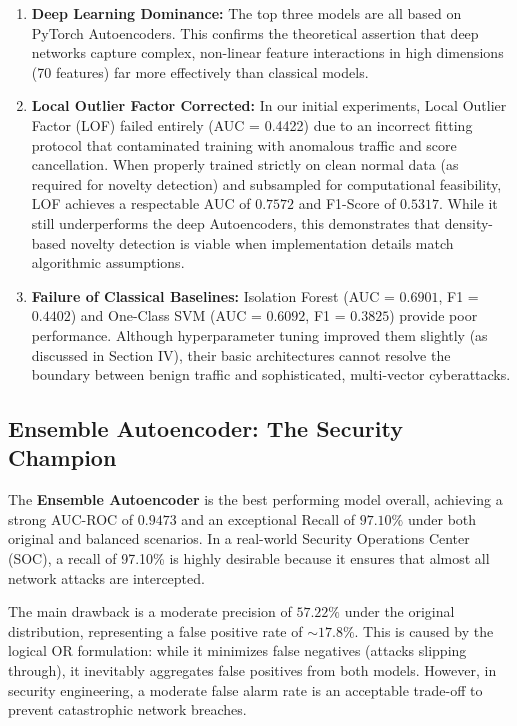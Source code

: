\begin{enumerate}
  \item \textbf{Deep Learning Dominance:} The top three models are all based on PyTorch Autoencoders. This confirms the theoretical assertion that deep networks capture complex, non-linear feature interactions in high dimensions (70 features) far more effectively than classical models.
  \item \textbf{Local Outlier Factor Corrected:} In our initial experiments, Local Outlier Factor (LOF) failed entirely (AUC = 0.4422) due to an incorrect fitting protocol that contaminated training with anomalous traffic and score cancellation. When properly trained strictly on clean normal data (as required for novelty detection) and subsampled for computational feasibility, LOF achieves a respectable AUC of $0.7572$ and F1-Score of $0.5317$. While it still underperforms the deep Autoencoders, this demonstrates that density-based novelty detection is viable when implementation details match algorithmic assumptions.
  \item \textbf{Failure of Classical Baselines:} Isolation Forest (AUC = $0.6901$, F1 = $0.4402$) and One-Class SVM (AUC = $0.6092$, F1 = $0.3825$) provide poor performance. Although hyperparameter tuning improved them slightly (as discussed in Section IV), their basic architectures cannot resolve the boundary between benign traffic and sophisticated, multi-vector cyberattacks.
\end{enumerate}

\subsection{Ensemble Autoencoder: The Security Champion}
The \textbf{Ensemble Autoencoder} is the best performing model overall, achieving a strong AUC-ROC of \textbf{$0.9473$} and an exceptional Recall of \textbf{$97.10\%$} under both original and balanced scenarios. In a real-world Security Operations Center (SOC), a recall of 97.10\% is highly desirable because it ensures that almost all network attacks are intercepted. 

The main drawback is a moderate precision of \textbf{$57.22\%$} under the original distribution, representing a false positive rate of $\sim 17.8\%$. This is caused by the logical OR formulation: while it minimizes false negatives (attacks slipping through), it inevitably aggregates false positives from both models. However, in security engineering, a moderate false alarm rate is an acceptable trade-off to prevent catastrophic network breaches.

